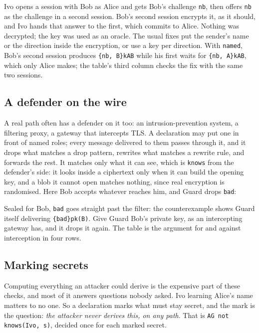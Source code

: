 Ivo opens a session with Bob as Alice and gets Bob's challenge \texttt{nb}, then
offers \texttt{nb} as the challenge in a second session. Bob's second session
encrypts it, as it should, and Ivo hands that answer to the first, which commits
to Alice. Nothing was decrypted; the key was used as an oracle. The usual fixes
put the sender's name or the direction inside the encryption, or use a key per
direction. With \texttt{named}, Bob's second session produces
\texttt{\{nb, B\}kAB} while his first waits for \texttt{\{nb, A\}kAB}, which
only Alice makes; the table's third column checks the fix with the same two
sessions.

\subsection{A defender on the wire}
\label{sec:defender}

A real path often has a defender on it too: an intrusion-prevention system, a
filtering proxy, a gateway that intercepts TLS. A declaration may put one in front
of named roles; every message delivered to them passes through it, and it drops
what matches a drop pattern, rewrites what matches a rewrite rule, and forwards
the rest. It matches only what it can see, which is \texttt{knows} from the
defender's side: it looks inside a ciphertext only when it can build the opening
key, and a blob it cannot open matches nothing, since real encryption is
randomised. Here Bob accepts whatever reaches him, and Guard drops \texttt{bad}:



\begin{center}

\end{center}

Sealed for Bob, \texttt{bad} goes straight past the filter: the counterexample
shows Guard itself delivering \texttt{\{bad\}pk(B)}. Give Guard Bob's private key,
as an intercepting gateway has, and it drops it again. The table is the argument
for and against interception in four rows.

\subsection{Marking secrets}
\label{sec:secrets}

Computing everything an attacker could derive is the expensive part of these
checks, and most of it answers questions nobody asked. Ivo learning Alice's name
matters to no one. So a declaration marks what must stay secret, and the mark is
the question: \emph{the attacker never derives this, on any path}. That is
\texttt{AG not knows(Ivo, s)}, decided once for each marked secret.

